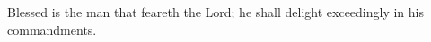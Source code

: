 
Blessed is the man that feareth the Lord; \GreStar he shall delight exceedingly in his commandments.